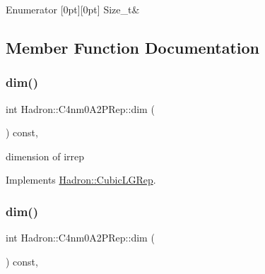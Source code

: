 \begin{DoxyEnumFields}{Enumerator}
[0pt][0pt]{}\mbox{\label{structHadron_1_1C4nm0A2PRep_ae0aec4e5427ffce8281880f79902d16cae0cd7ad2764f3c3fab11f21bef098c46}} 
Size\+\_\+t&\\
\hline

\end{DoxyEnumFields}


\subsection{Member Function Documentation}
\mbox{\label{structHadron_1_1C4nm0A2PRep_a5a7d243b4be2939bb39515b7563a804d}} 
\subsubsection{\texorpdfstring{dim()}{dim()}\hspace{0.1cm}{\footnotesize\ttfamily [1/3]}}
{\footnotesize\ttfamily int Hadron\+::\+C4nm0\+A2\+P\+Rep\+::dim (\begin{DoxyParamCaption}{ }\end{DoxyParamCaption}) const\hspace{0.3cm}{\ttfamily [inline]}, {\ttfamily [virtual]}}

dimension of irrep 

Implements \mbox{\hyperlink{structHadron_1_1CubicLGRep_a3acbaea26503ed64f20df693a48e4cdd}{Hadron\+::\+Cubic\+L\+G\+Rep}}.

\mbox{\label{structHadron_1_1C4nm0A2PRep_a5a7d243b4be2939bb39515b7563a804d}} 
\subsubsection{\texorpdfstring{dim()}{dim()}\hspace{0.1cm}{\footnotesize\ttfamily [2/3]}}
{\footnotesize\ttfamily int Hadron\+::\+C4nm0\+A2\+P\+Rep\+::dim (\begin{DoxyParamCaption}{ }\end{DoxyParamCaption}) const\hspace{0.3cm}{\ttfamily [inline]}, {\ttfamily [virtual]}}

